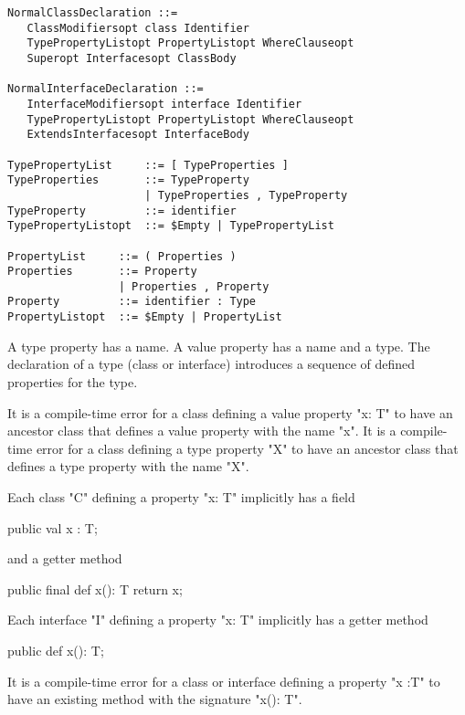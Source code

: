 \begin{verbatim}
NormalClassDeclaration ::= 
   ClassModifiersopt class Identifier 
   TypePropertyListopt PropertyListopt WhereClauseopt
   Superopt Interfacesopt ClassBody

NormalInterfaceDeclaration ::= 
   InterfaceModifiersopt interface Identifier 
   TypePropertyListopt PropertyListopt WhereClauseopt
   ExtendsInterfacesopt InterfaceBody

TypePropertyList     ::= [ TypeProperties ]
TypeProperties       ::= TypeProperty
                     | TypeProperties , TypeProperty
TypeProperty         ::= identifier    
TypePropertyListopt  ::= $Empty | TypePropertyList

PropertyList     ::= ( Properties )
Properties       ::= Property
                 | Properties , Property
Property         ::= identifier : Type
PropertyListopt  ::= $Empty | PropertyList
\end{verbatim}

A type property has a name.
A value property has a name and a type. The declaration of a type (class or
interface) introduces a sequence of defined properties for the type. 

\begin{staticrule*}
It is a compile-time error for a class
defining a value property \xcd"x: T" to have an ancestor class that defines
a value property with the name \xcd"x".  
It is a compile-time error for a class
defining a type property \xcd"X" to have an ancestor class that defines
a type property with the name \xcd"X".  
\end{staticrule*}


Each class \xcd"C" defining a property \xcd"x: T" implicitly has a field

\begin{xten}
public val x : T;
\end{xten}

\noindent and a getter method 

\begin{xten}
public final def x(): T { return x; }
\end{xten}

\noindent Each interface \xcd"I" defining a property \xcd"x: T"
implicitly has a getter method

\begin{xten}
public def x(): T;
\end{xten}

\begin{staticrule*}
It is a compile-time error for a class or
interface defining a property \xcd"x :T" to have an existing method with
the signature \xcd"x(): T".   
\end{staticrule*}


